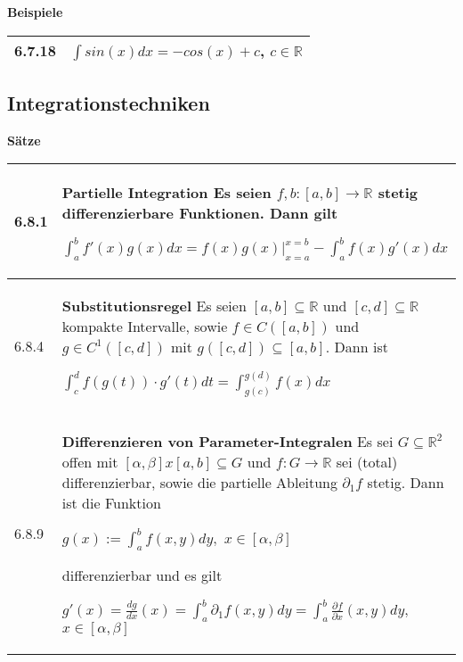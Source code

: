     \noindent
    \textbf{Beispiele}
    \begin{table}[H]
    \begin{tabularx}{\textwidth}{X m{16cm}}
        \toprule

        6.7.18& $\int sin(x) dx = -cos(x) + c$, $c \in \mathbb{R}$ \\

        \bottomrule
    \end{tabularx}
    \end{table}

\subsection{Integrationstechniken}

    \noindent 
    \textbf{Sätze}
    \begin{table}[H]
    \begin{tabularx}{\textwidth}{X m{16cm}}
        \toprule

        6.8.1 & \textbf{Partielle Integration} \hfill \break
                Es seien $f,b :[a,b] \rightarrow \mathbb{R}$ stetig differenzierbare Funktionen. Dann gilt \hfill \break
                \centerline{$ \int_a^b f'(x) g(x) dx = f(x) g(x) \vert_{x=a}^{x=b} - \int_a^b f(x) g'(x) dx $} \\
        \midrule
        6.8.4 & \textbf{Substitutionsregel} \hfill \break
                Es seien $[a,b] \subseteq \mathbb{R}$ und $[c,d] \subseteq \mathbb{R}$ kompakte Intervalle, sowie $f \in C([a,b])$ und 
                $g \in C^1([c,d])$ mit $g([c,d]) \subseteq [a,b]$. Dann ist \hfill \break
                \centerline{$ \int_c^d f(g(t)) \cdot g'(t) dt = \int^{g(d)}_{g(c)} f(x) dx $} \\
        \midrule
        6.8.9 & \textbf{Differenzieren von Parameter-Integralen} \hfill \break
                Es sei $G \subseteq \mathbb{R}^2$ offen mit $[\alpha, \beta] x [a,b] \subseteq G$ und $f: G \rightarrow \mathbb{R}$ sei 
                (total) differenzierbar, sowie die partielle Ableitung $\partial_1 f$ stetig. Dann ist die Funktion \hfill \break
                \centerline{$ g(x) := \int_a^b f(x,y) dy,$ $x \in [\alpha, \beta] $}
                differenzierbar und es gilt \hfill \break
                \centerline{$ g'(x) = \frac{dg}{dx}(x) = \int_a^b \partial_1 f(x,y) dy = \int_a^b \frac{\partial f}{\partial x}(x,y)dy,$
                 $x \in [\alpha, \beta]$} \\

        \bottomrule
    \end{tabularx}
    \end{table}

